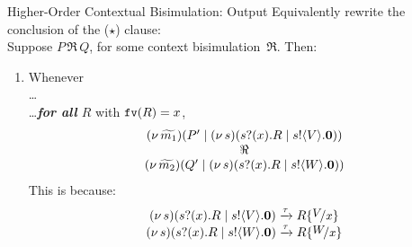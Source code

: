 \documentclass{beamer}
\begin{document}
	\begin{frame}{Higher-Order Contextual Bisimulation: Output}
		Equivalently rewrite the conclusion of the ($\star$) clause:
		\\[2mm]

		Suppose $P \,\Re\, Q$, for some context bisimulation~$\Re$. Then:
		\begin{enumerate}[$(\star)$]
			\item	Whenever\\
				\dots\\
				\dots \emph{\textbf{for all} $R$}  with $\mathtt{fv}(R)=x$, 
				\[
					\begin{array}{c}
						(\nu\, \widetilde{m_1})(P' \;|\; (\nu\, s)(s ? (x) . R \;|\;  s ! \langle V \rangle . \mathbf{0}))
						\\
						\Re
						\\
						(\nu\, \widetilde{m_2})(Q' \;|\; (\nu\, s)(s ? (x) . R \;|\; s ! \langle W \rangle . \mathbf{0}))
					\end{array}
				\]
				This is because:
				\[
					\begin{array}{c}
						\newsp{s}{\binp{s}{x} R \Par \bout{s}{V} \inact}
						\by{\tau}
						R \subst{V}{x}
						\\
						\newsp{s}{\binp{s}{x} R \Par \bout{s}{W} \inact}
						\by{\tau}
						R \subst{W}{x}
					\end{array}
				\]
		\end{enumerate}
	\end{frame}
\end{document}
